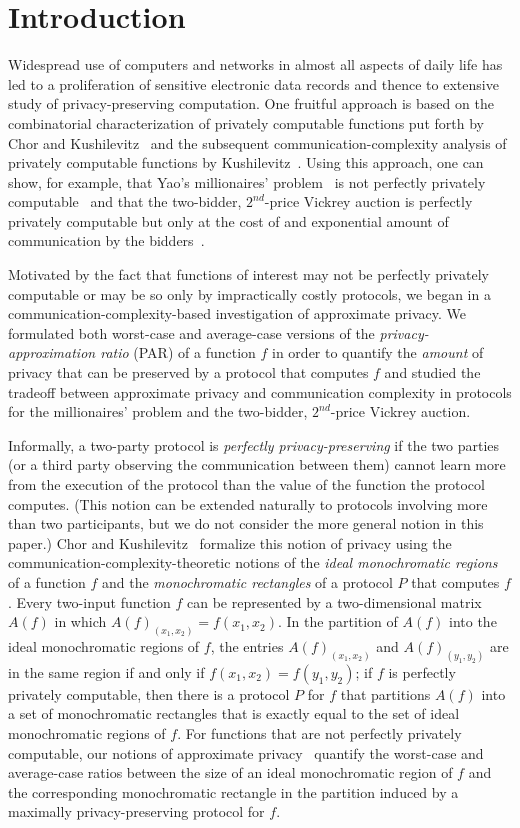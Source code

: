 \documentclass{article}
\theoremstyle{theorem}
\theoremstyle{definition}
\theoremstyle{remark}
\begin{document}
\newpage

\section{Introduction}\label{sec-intro}

Widespread use of computers and networks in almost all aspects of daily life has led to a
proliferation of sensitive electronic data records and thence to extensive study of privacy-preserving
computation.  One fruitful approach is based on the combinatorial characterization
of privately computable functions put forth by Chor and Kushilevitz~\cite{CK91} and the subsequent
communication-complexity analysis of privately computable functions by Kushilevitz~\cite{K92}.  Using this
approach, one can show, for example, that Yao's millionaires' problem~\cite{Y79} is not
perfectly privately computable~\cite{CK91} and that the two-bidder, $2^{nd}$-price Vickrey
auction is perfectly privately computable but only at the cost of and exponential amount of
communication by the bidders~\cite{BS}.

Motivated by the fact that functions of interest may not be perfectly
privately computable or may be so only by impractically costly protocols, we began
in \cite{fjs09tr14} a communication-complexity-based investigation of approximate privacy.
We formulated both worst-case and
average-case versions of the {\it privacy-approximation ratio} (PAR) of a
function $f$ in order to quantify the {\it amount} of privacy that can be
preserved by a protocol that computes $f$ and studied the tradeoff between
approximate privacy and communication complexity in protocols for the millionaires' problem
and the two-bidder, $2^{nd}$-price Vickrey auction.

Informally, a two-party protocol is \emph{perfectly
privacy-preserving} if the two parties (or a third party observing
the communication between them) cannot learn more from the execution
of the protocol than the value of the function the protocol
computes.  (This notion can be extended naturally to protocols
involving more than two participants, but we do not consider the more general notion
in this paper.)  Chor and Kushilevitz~\cite{CK91,K92} formalize this notion of privacy using
the communication-complexity-theoretic notions of the {\it ideal monochromatic regions} of
a function $f$ and the {\it monochromatic rectangles} of a protocol $P$ that computes $f$.
Every two-input function $f$ can be represented by a two-dimensional matrix $A(f)$ in which
$A(f)_{(x_1,x_2)} = f(x_1,x_2)$.  In the partition of $A(f)$ into the ideal monochromatic
regions of $f$, the entries $A(f)_{(x_1,x_2)}$ and $A(f)_{(y_1,y_2)}$ are in the same region
if and only if $f(x_1,x_2)=f(y_1,y_2)$; if $f$ is perfectly privately computable, then there
is a protocol $P$ for $f$ that partitions $A(f)$ into a set of monochromatic rectangles that
is exactly equal to the set of ideal monochromatic regions of $f$.  For functions that are
not perfectly privately computable, our notions of approximate privacy~\cite{fjs09tr14}
quantify the worst-case and average-case ratios between the size of an ideal monochromatic
region of $f$ and the corresponding monochromatic rectangle in the partition induced by a
maximally privacy-preserving protocol for $f$.
\end{document}
